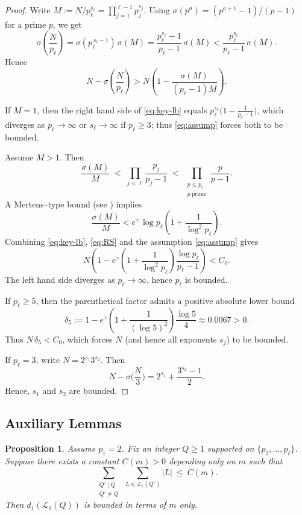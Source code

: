 \documentclass[11pt,reqno]{amsart}
\newtheorem{proposition}[theorem]{Proposition}
\theoremstyle{definition}
\newcommand{\Lset}{\mathcal{L}}
\begin{document}
\begin{proof}
Write \(M:=N/p_\ell^{s_\ell}=\prod_{j=1}^{\ell-1}p_j^{s_j}\).
Using \(\sigma(p^{a})=(p^{a+1}-1)/(p-1)\) for a prime \(p \), we get
\[
  \sigma\!\left(\frac{N}{p_\ell}\right)
  =\sigma(p_\ell^{\,s_\ell-1})\,\sigma(M)
  =\frac{p_\ell^{s_\ell}-1}{p_\ell-1}\,\sigma(M)
  < \frac{p_\ell^{s_\ell}}{p_\ell-1}\,\sigma(M).
\]
Hence
\begin{equation}\label{eq:key-lb}
  N-\sigma\!\left(\frac{N}{p_\ell}\right)
  >  N\!\left(1-\frac{\sigma(M)}{(p_\ell-1)M}\right).
\end{equation}

If \(M=1\), then the right hand side of \eqref{eq:key-lb} equals
\(p_\ell^{s_\ell}\bigl(1-\frac{1}{p_\ell-1}\bigr)\), which diverges as \(p_\ell\to\infty\) or
\(s_\ell\to\infty\) if \(p_\ell \ge 3\); thus \eqref{eq:assump} forces both to be bounded.

Assume \(M>1\). Then
\[
  \frac{\sigma(M)}{M}
  \;<\; \prod_{j<\ell}\frac{p_j}{p_j-1}
  \;<\; \prod_{\substack{p\le p_\ell\\ p\ \text{prime}}}\frac{p}{p-1}.
\]
A Mertens--type bound (see \cite{RosserSchoenfeld1962}) implies
\begin{equation}\label{eq:RS}
  \frac{\sigma(M)}{M}
  < e^{\gamma}\,\log p_\ell\!\left(1+\frac{1}{\log^{2}p_\ell}\right).
\end{equation}
Combining \eqref{eq:key-lb}, \eqref{eq:RS}
and the assumption \eqref{eq:assump} gives
\begin{equation}\label{eq:main}
  N\!\left(1- e^{\gamma}\!\left(1+\frac{1}{\log^{2}p_\ell}\right)
           \frac{\log p_\ell}{p_\ell-1}\right) < C_0 .
\end{equation}
The left hand side diverges as \(p_\ell\to\infty\), hence \(p_\ell\) is bounded.

If \(p_\ell\ge5\), then the parenthetical factor admits a positive absolute lower
bound
\[
  \delta_5:=1- e^{\gamma}\!\left(1+\frac{1}{(\log 5)^2}\right)\frac{\log 5}{4}
  \approx 0.0067>0 .
\]
Thus \(N\,\delta_5<C_0\), which forces \(N\) (and hence all exponents \(s_j\)) to
be bounded.

If \(p_\ell = 3\), write \(N = 2^{s_1}3^{s_2}\). Then
\[
 N-\sigma\!\Big(\frac{N}{3}\Big)
  = 2^{s_1} + \frac{3^{s_2}-1}{2}.
\]
Hence, \(s_1\) and \(s_2\) are bounded.
\end{proof}

\subsection{Auxiliary Lemmas}
\begin{proposition}
\label{prop:bound-v2-even}
Assume \(p_1=2\).
Fix an integer \(Q \ge 1\) supported on \(\{p_2,\dots,p_\ell\}\). Suppose there exists a constant \(C(m)>0\) depending only on \(m\) such that
\[ \sum_{\substack{Q'\mid Q\\ Q'\neq Q}}\ \sum_{L\in\Lset_1(Q')} |L|\ \le\ C(m). \]
Then \(d_1(\Lset_1(Q))\) is bounded in terms of \(m\) only.
\end{proposition}
\end{document}
